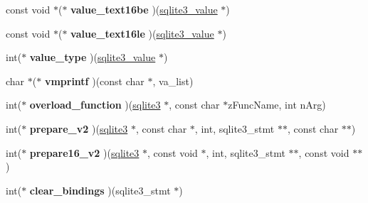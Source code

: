 \begin{DoxyCompactItemize}
\item 
\hypertarget{structsqlite3__api__routines_abdb7dd82bf4147ac140df3f4d36a1c20}{const void $\ast$($\ast$ {\bfseries value\-\_\-text16be} )(\hyperlink{struct_mem}{sqlite3\-\_\-value} $\ast$)}\label{structsqlite3__api__routines_abdb7dd82bf4147ac140df3f4d36a1c20}

\item 
\hypertarget{structsqlite3__api__routines_aa3a4150e9ecc70a364f09ae446ccab7d}{const void $\ast$($\ast$ {\bfseries value\-\_\-text16le} )(\hyperlink{struct_mem}{sqlite3\-\_\-value} $\ast$)}\label{structsqlite3__api__routines_aa3a4150e9ecc70a364f09ae446ccab7d}

\item 
\hypertarget{structsqlite3__api__routines_a682549a9b9c8d95f9dcee8428cd25377}{int($\ast$ {\bfseries value\-\_\-type} )(\hyperlink{struct_mem}{sqlite3\-\_\-value} $\ast$)}\label{structsqlite3__api__routines_a682549a9b9c8d95f9dcee8428cd25377}

\item 
\hypertarget{structsqlite3__api__routines_a9de374e1a95d8b049dae5c5833fd93f0}{char $\ast$($\ast$ {\bfseries vmprintf} )(const char $\ast$, va\-\_\-list)}\label{structsqlite3__api__routines_a9de374e1a95d8b049dae5c5833fd93f0}

\item 
\hypertarget{structsqlite3__api__routines_aae9b181f076ae18804590924aa791101}{int($\ast$ {\bfseries overload\-\_\-function} )(\hyperlink{structsqlite3}{sqlite3} $\ast$, const char $\ast$z\-Func\-Name, int n\-Arg)}\label{structsqlite3__api__routines_aae9b181f076ae18804590924aa791101}

\item 
\hypertarget{structsqlite3__api__routines_adf1956e4240b4573ec5d1c0e079a0dc2}{int($\ast$ {\bfseries prepare\-\_\-v2} )(\hyperlink{structsqlite3}{sqlite3} $\ast$, const char $\ast$, int, sqlite3\-\_\-stmt $\ast$$\ast$, const char $\ast$$\ast$)}\label{structsqlite3__api__routines_adf1956e4240b4573ec5d1c0e079a0dc2}

\item 
\hypertarget{structsqlite3__api__routines_aa2ac35f69a60c329e4129dd67f7c5662}{int($\ast$ {\bfseries prepare16\-\_\-v2} )(\hyperlink{structsqlite3}{sqlite3} $\ast$, const void $\ast$, int, sqlite3\-\_\-stmt $\ast$$\ast$, const void $\ast$$\ast$)}\label{structsqlite3__api__routines_aa2ac35f69a60c329e4129dd67f7c5662}

\item 
\hypertarget{structsqlite3__api__routines_a6154fab4f9101c9ababb806dac91d01f}{int($\ast$ {\bfseries clear\-\_\-bindings} )(sqlite3\-\_\-stmt $\ast$)}\label{structsqlite3__api__routines_a6154fab4f9101c9ababb806dac91d01f}


\end{DoxyCompactItemize}
